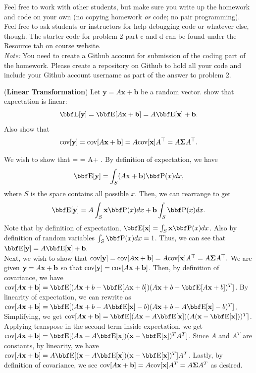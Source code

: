 \documentclass[12pt,letterpaper]{hmcpset}
\begin{document}
Feel free to work with other students, but make sure you write up the homework
and code on your own (no copying homework \textit{or} code; no pair programming).
Feel free to ask students or instructors for help debugging code or whatever else,
though.
The starter code for problem 2 part c and d can be found under the Resource tab on course website.\\

\textit{Note:} You need to create a Github account for submission of the coding part of the homework. Please create a repository on Github to hold all your code and include your Github account username as part of the answer to problem 2.

\begin{problem}[1]
(\textbf{Linear Transformation}) Let $\mathbf{y} = A\mathbf{x} + \mathbf{b}$ be a random vector.
show that expectation is linear:
\[
    \EE[\yy] = \EE[A\xx + \bb] = A\EE[\xx] + \bb.
\]
Also show that
\[
    {\hbox{cov}}[{\bf y}] = {\hbox{cov}}[A{\bf x} + {\bf b}] = A {\hbox{cov}}[{\bf x}] A^\top = A\hbox{\boldmath$\Sigma$} A^\top.
\]
\end{problem}
\begin{solution} 

	We wish to show that \EE[\yy] = \EE[A\xx + \bb] = A\EE[\xx] + \bb. By definition of expectation, we have $$\EE[\yy] = \int_S(A\xx + \bb)\PP(x)dx,$$ where $S$ is the space contains all possible $x$. Then, we can rearrange to get $$\EE[\yy] =  A\int_S\xx \PP(x)dx +  \bb\int_S\PP(x)dx.$$ Note that by definition of expectation, $\EE[\xx] =\int_S\xx \PP(x)dx$. Also by definition of random variables $\int_S\PP(x)dx =1$. Thus, we can see that $\EE[\yy] =  A\EE[\xx] +  \bb.$\\
    	
    Next, we wish to show that ${\hbox{cov}}[{\bf y}] = {\hbox{cov}}[A{\bf x} + {\bf b}] = A {\hbox{cov}}[{\bf x}] A^\top = A\hbox{\boldmath$\Sigma$} A^\top.$ We are given ${\bf y} = A{\bf x} + {\bf b}$ so that ${\hbox{cov}}[{\bf y}] = {\hbox{cov}}[A{\bf x}+{\bf b}]$. Then, by definition of covariance, we have $\cov[A\xx+\bb] = \EE[(A\xx+b - \EE[A\xx+b])(A\xx+b - \EE[A\xx+b])^T]$. By linearity of expectation, we can rewrite as $\cov[A\xx+\bb] = \EE[(A\xx+b - A\EE[\xx] - b)(A\xx+b - A\EE[\xx]-b)^T]$. Simplifying, we get $\cov[A\xx+\bb] = \EE[(A\xx - A\EE[\xx])(A(\xx- \EE[\xx]))^T]$. Applying transpose in the second term inside expectation, we get $\cov[A\xx+\bb] = \EE[(A\xx - A\EE[\xx])(\xx- \EE[\xx])^TA^T]$. Since $A$ and $A^T$ are constants, by linearity, we have $\cov[A\xx+\bb] = A\EE[(\xx - A\EE[\xx])(\xx- \EE[\xx])^T]A^T$. Lastly, by definition of covariance, we see ${\hbox{cov}}[A{\bf x}+{\bf b}] = A{\hbox{cov}}[{\bf x}]A^T = A\hbox{\boldmath$\Sigma$} A^T$ as desired.
\end{solution}
\newpage
\end{document}
